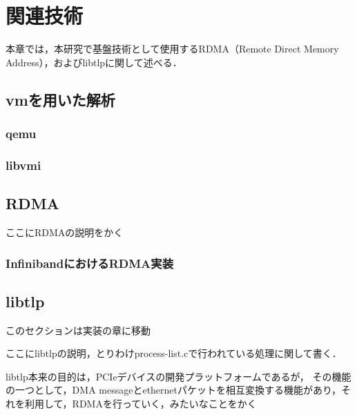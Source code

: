 \chapter{関連技術}
\label{chap:related_works}

本章では，本研究で基盤技術として使用するRDMA（Remote Direct Memory Address），およびlibtlpに関して述べる．

\section{vmを用いた解析}

\subsection{qemu}

\subsection{libvmi}

\section{RDMA}

ここにRDMAの説明をかく

\subsection{InfinibandにおけるRDMA実装}

\section{libtlp}

このセクションは実装の章に移動

ここにlibtlpの説明，とりわけprocess-list.cで行われている処理に関して書く．

libtlp本来の目的は，PCIeデバイスの開発プラットフォームであるが，
その機能の一つとして，DMA messageとethernetパケットを相互変換する機能があり，それを利用して，RDMAを行っていく，みたいなことをかく
